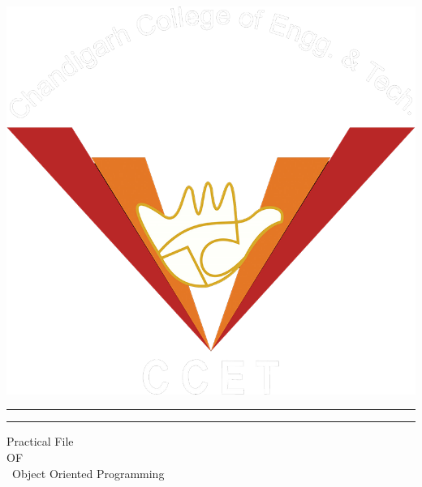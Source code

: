 \begin{titlepage} %

	\begin{center}
   \includegraphics[scale=0.2]{ccet.png}
\end{center}

	\centering %
	
	\scshape %
	
	\vspace*{\baselineskip} %
	
	
	\rule{\textwidth}{1.6pt}\vspace*{-\baselineskip}\vspace*{2pt} %
	\rule{\textwidth}{0.4pt} %
	
	\vspace{0.75\baselineskip} %
	
	{\LARGE Practical File\\ OF\\ \ Object Oriented Programming\\} %
	

\end{titlepage}
